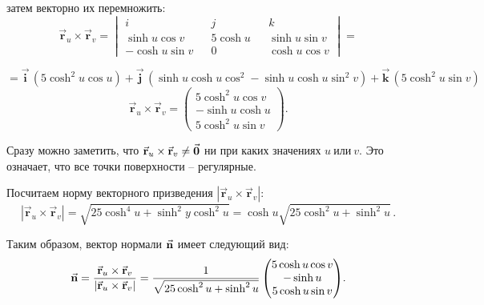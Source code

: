 \documentclass[12pt,a4paper]{article}
\newcommand{\boldVec}[1]{\vec{\mathbf #1}}
\newcommand{\vectorProduct}[2]{\boldVec #1 \times \boldVec #2}
\begin{document}
    \noindent затем векторно их перемножить:
    \[
        \vectorProduct{r _u}{r_v} = 
            \begin{vmatrix}
                i && j && k
                \\
                \sinh u \cos v && 5\cosh u && \sinh u \sin v
                \\
                -\cosh u \sin v && 0 && \cosh u \cos v
            \end{vmatrix}
        =
    \]

    \noindent $ = \boldVec i\,(5 \cosh^2 u \cos u ) + \boldVec j\,(\sinh u \cosh u \cos^2 - \sinh u \cosh u \sin^2 v) + \boldVec k\,(5 \cosh^2 u \sin v) $
    \[
       \vectorProduct{r_u}{r_v} =
        \begin{pmatrix}
            5 \cosh^2 u \cos v
            \\
            -\sinh u \cosh u
            \\
            5 \cosh^2 u \sin v
        \end{pmatrix}\! .
    \]

    Сразу можно заметить, что $ \boldVec r_u \times \boldVec r_v \ne \vec{\textbf 0}$ ни при каких значениях $ u \ \text{или} \ v $. Это означает, что все точки поверхности -- регулярные.

    Посчитаем норму векторного призведения $ | \boldVec r_u \times \boldVec r_v | $: 
    \[
        | \boldVec r_u \times \boldVec r_v | = \sqrt{25 \cosh^4 u + \sinh^2 y \cosh^2 u} = \cosh u \sqrt { 25 \cosh^2 u + \sinh^2 u }\, . 
    \]

    Таким образом, вектор нормали $ \vec{\textbf n} $ имеет следующий вид: 
    \[
        \vec{\textbf n} = \frac{\boldVec r_u \times \boldVec r_v}{| \boldVec r_u \times \boldVec r_v |} = \frac{1}{\sqrt{25 \cosh^2 u + \sinh^2 u}}
        \begin{pmatrix}
            5 \cosh u \cos v
            \\
            -\sinh u
            \\
            5 \cosh u \sin v
        \end{pmatrix} \! .
    \]
\end{document}
